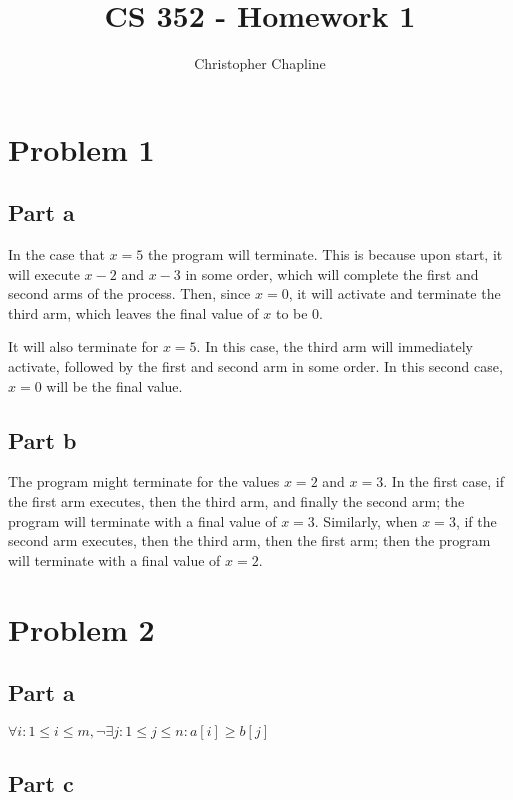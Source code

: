 \documentclass{article}%
\begin{document}
\title{CS 352 - Homework 1}
\author{Christopher Chapline}
\maketitle

\section{Problem 1}

\subsection{Part a}
In the case that $x=5$ the program will terminate. This is because upon start, it will execute $x-2$ and $x-3$ in some order, which will complete the first and second arms of the process. Then, since $x=0$, it will activate and terminate the third arm, which leaves the final value of $x$ to be 0.

\noindent It will also terminate for $x=5$. In this case, the third arm will immediately activate, followed by the first and second arm in some order. In this second case, $x=0$ will be the final value.

\subsection{Part b}
The program might terminate for the values $x=2$ and $x=3$. In the first case, if the first arm executes, then the third arm, and finally the second arm; the program will terminate with a final value of $x=3$. Similarly, when $x=3$, if the second arm executes, then the third arm, then the first arm; then the program will terminate with a final value of $x=2$.


\section{Problem 2}

\subsection{Part a}

$\forall i : 1 \leq i \leq m, \neg \exists j : 1 \leq j \leq n : a[i] \geq b[j]$

\subsection{Part c}
\end{document}
